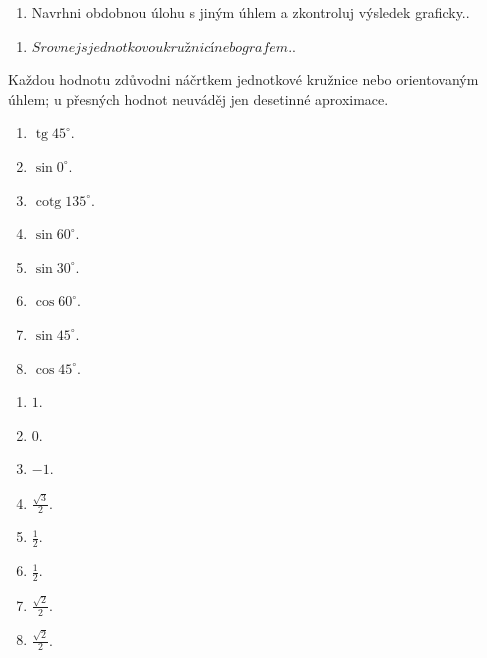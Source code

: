 \documentclass[11pt,a4paper]{article}
\begin{document}
\begin{zadaniReseniBox}[title={Rozšíření 1}]
\begin{enumerate}[label=\alph*)]
\item Navrhni obdobnou úlohu s jiným úhlem a zkontroluj výsledek graficky..
\end{enumerate}
\tcblower
\begin{enumerate}[label=\alph*)]
\item $Srovnej s jednotkovou kružnicí nebo grafem.$.
\end{enumerate}
\end{zadaniReseniBox}
Každou hodnotu zdůvodni náčrtkem jednotkové kružnice nebo orientovaným úhlem; u přesných hodnot neuváděj jen desetinné aproximace.
\begin{zadaniReseniBox}[title={Domácí úkol}]
\begin{enumerate}[label=\alph*)]
\item $\operatorname{tg}45^\circ$.
\item $\sin0^\circ$.
\item $\operatorname{cotg}135^\circ$.
\item $\sin60^\circ$.
\item $\sin30^\circ$.
\item $\cos60^\circ$.
\item $\sin45^\circ$.
\item $\cos45^\circ$.
\end{enumerate}
\tcblower
\begin{enumerate}[label=\alph*)]
\item $1$.
\item $0$.
\item $-1$.
\item $\frac{\sqrt3}{2}$.
\item $\frac{1}{2}$.
\item $\frac{1}{2}$.
\item $\frac{\sqrt2}{2}$.
\item $\frac{\sqrt2}{2}$.
\end{enumerate}
\end{zadaniReseniBox}
\end{document}
